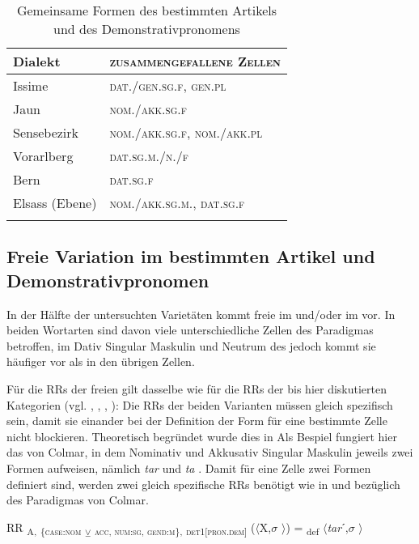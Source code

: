 
\begin{table}
\caption{Gemeinsame Formen des bestimmten Artikels und des Demonstrativpronomens}\label{table5.26}
\begin{tabular}{l>{\scshape}l}
\lsptoprule
{Dialekt} & {\upshape zusammengefallene Zellen}\\
\midrule
Issime & dat./gen.sg.f, gen.pl\\
Jaun & nom./akk.sg.f\\
Sensebezirk & nom./akk.sg.f, nom./akk.pl\\
Vorarlberg & dat.sg.m./n./f\\
Bern & dat.sg.f\\
Elsass (Ebene) & nom./akk.sg.m., dat.sg.f\\
\lspbottomrule
\end{tabular}
\end{table}

\subsection{Freie Variation im bestimmten Artikel und Demonstrativpronomen}\label{5.5.4}

In der Hälfte der untersuchten Varietäten kommt freie  im  und/oder im  vor. In beiden Wortarten sind davon viele unterschiedliche Zellen des Paradigmas betroffen, im Dativ Singular Maskulin und Neutrum des  jedoch kommt sie häufiger vor als in den übrigen Zellen.

Für die RRs der freien  gilt dasselbe wie für die RRs der bis hier diskutierten Kategorien (vgl. , , , ): Die RRs der beiden Varianten müssen gleich spezifisch sein, damit sie einander bei der Definition der Form für eine bestimmte Zelle nicht blockieren. Theoretisch begründet wurde dies in  Als Bespiel fungiert hier das  von Colmar, in dem Nominativ und Akkusativ Singular Maskulin jeweils zwei Formen aufweisen, nämlich \textit{tar} und \textit{ta} \citep[83]{Henry1900}. Damit für eine Zelle zwei Formen definiert sind, werden zwei gleich spezifische RRs benötigt wie in  und  bezüglich des Paradigmas von Colmar.

\ea%
\label{ex:key:138}
 RR \textsubscript{A,} \textsubscript{\{\textsc{case:nom}} \textsubscript{\tiny $\veebar$}\textsubscript{ \textsc{acc}}\textsubscript{, \textsc{num:sg}, \textsc{gend:m}\},} \textsubscript{\textsc{det1[pron.dem]}} ($\langle$X,$\sigma$ $\rangle$) = \textsubscript{def} $\langle$\textit{tar}ˊ,$\sigma$ $\rangle$
\z

